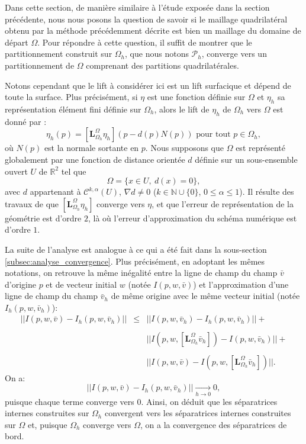 Dans cette section, de manière similaire à l'étude exposée dans la section précédente, nous nous posons la question de savoir si le maillage quadrilatéral obtenu par la méthode précédemment décrite est bien un maillage du domaine de départ $\Omega$. Pour répondre à cette question, il suffit de montrer que le partitionnement construit sur $\Omega_h$, que nous notons $\mathcal{P}_h$, converge vers un partitionnement de $\Omega$ comprenant des partitions quadrilatérales.

Notons cependant que le lift à considérer ici est un lift surfacique et dépend de toute la surface. Plus précisément, si $\eta$ est une fonction définie sur $\Omega$ et $\eta_h$ sa représentation élément fini définie sur $\Omega_h$, alors le lift de $\eta_h$ de $\Omega_h$ vers $\Omega$ est donné par :
\begin{equation}
\eta_h(p)=[\mathbf{L}_{\Omega_h}^{\Omega}\eta_h](p-d(p)N(p))\text{ pour tout }p\in\Omega_h,
\end{equation}
où $N(p)$ est la normale sortante en $p$. Nous supposons que $\Omega$ est représenté globalement par une fonction de distance orientée $d$ définie sur un sous-ensemble ouvert $U$ de $\mathbb{R}^2$ tel que
\[
\Omega=\{x\in U,~d(x)=0\},
\]
avec $d$ appartenant à $\mathcal{C}^{k,\alpha}(U)$, $\nabla d\neq 0$ ($k\in\mathbb{N}\cup\{0\}$, $0\leq\alpha\leq 1$). Il résulte des travaux de \cite{dziuk1988finite} que $[\mathbf{L}_{\Omega_h}^{\Omega}\eta_h]$ converge vers $\eta$, et que l'erreur de représentation de la géométrie est d'ordre $2$, là où l'erreur d'approximation du schéma numérique est d'ordre $1$.

La suite de l'analyse est analogue à ce qui a été fait dans la sous-section \ref{subsec:analyse_convergence}. Plus précisément, en adoptant les mêmes notations, on retrouve la même inégalité entre la ligne de champ du champ $\bar{v}$ d'origine $p$ et de vecteur initial $w$ (notée $I(p,w,\bar{v})$) et l'approximation d'une ligne de champ du champ $\bar{v}_h$ de même origine avec le même vecteur initial (notée $I_h(p,w,\bar{v}_h)$):
\begin{eqnarray*}
||I(p,w,\bar{v})-I_h(p,w,\bar{v}_h)||&\leq& ||I(p,w,\bar{v}_h)-I_h(p,w,\bar{v}_h)|| +\\\\
&&||I(p,w,[\mathbf{L}_{\Omega_h}^{\Omega}\bar{v}_h])-I(p,w,\bar{v}_h)||+\\\\
&&||I(p,w,\bar{v})-I(p,w,[\mathbf{L}_{\Omega_h}^{\Omega}\bar{v}_h])||.
\end{eqnarray*}
On a:
$$||I(p,w,\bar{v})-I_h(p,w,\bar{v}_h)||\xrightarrow[h \to 0]{} 0,$$
puisque chaque terme converge vers $0$. Ainsi, on déduit que les séparatrices internes construites sur $\Omega_h$ convergent vers les séparatrices internes construites sur $\Omega$ et, puisque $\Omega_h$ converge vers $\Omega$, on a la convergence des séparatrices de bord.


